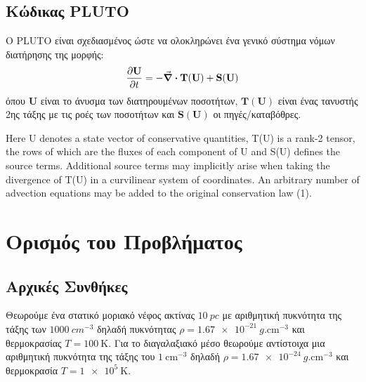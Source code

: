 \documentclass[article,a4paper,11.2pt]{memoir}
\numberwithin{equation}{subsection}
\begin{document}
\subsection{Κώδικας PLUTO}

Ο PLUTO είναι σχεδιασμένος ώστε να ολοκληρώνει ένα γενικό σύστημα νόμων διατήρησης της μορφής:
\begin{equation}
\pdv{\mathbf{U}}{t} = -\div \mathbf{T}(\mathbf{U}) +\mathbf{S}(\mathbf{U})
\end{equation}
όπου $\mathbf{U}$ είναι το άνυσμα των διατηρουμένων ποσοτήτων, $\mathbf{T}(\mathbf{U})$ είναι ένας τανυστής 2ης τάξης με τις ροές των ποσοτήτων και $\mathbf{S}(\mathbf{U})$ οι πηγές/καταβόθρες.

Here U denotes a state vector of conservative quantities, T(U) is a rank-2 tensor, the rows of which are the
fluxes of each component of U and S(U) defines the source terms. Additional source terms may implicitly
arise when taking the divergence of T(U) in a curvilinear system of coordinates. An arbitrary number of
advection equations may be added to the original conservation law (1).

%
%


	\section{Ορισμός του Προβλήματος}
	\subsection{Αρχικές Συνθήκες}
	\label{par:InitialConditions}
	Θεωρούμε ένα στατικό μοριακό νέφος ακτίνας $\SI{10} {pc}$ με αριθμητική πυκνότητα
	της τάξης των $\SI{1000}{cm^{-3}}$ δηλαδή πυκνότητας $\rho=\SI{1.67e-21}{g. \cm^{-3}}$ και θερμοκρασίας $T=\SI{100}{\kelvin}$.
	Για το διαγαλαξιακό μέσο θεωρούμε αντίστοιχα μια αριθμητική πυκνότητα της τάξης του 
	$\SI{1}{\cm^{-3}}$ δηλαδή $\rho=\SI{1.67e-24}{g. \cm^{-3}}$ και θερμοκρασία $T=\SI{1e5}{\kelvin}$.
\end{document}
